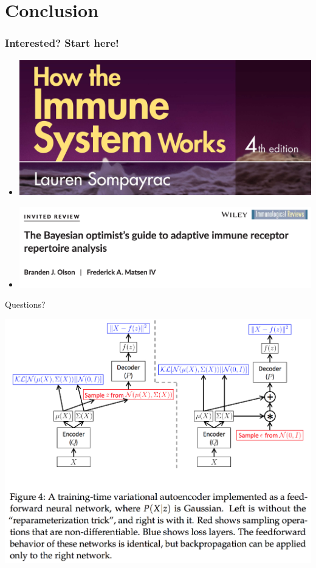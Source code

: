 \documentclass[mathserif,compress]{beamer}
\renewcommand\;{\,}
\begin{document}
\section{Conclusion}

\begin{frame}\frametitle{Interested? Start here!}
\begin{itemize}
\item[]
\begin{center}
\includegraphics[width=0.8 \linewidth]{Images/Sompayrac.png}
\end{center}
\bigskip
\item[]
\begin{center}
\includegraphics[width=\linewidth]{Images/Optimist.png}
\end{center}
\end{itemize}
\end{frame}

\begin{frame}
\begin{center}
\large
Questions?
\end{center}
\end{frame}

\begin{frame}
\begin{center}
\includegraphics[width=\linewidth]{Images/VAE_diagram.png}
\end{center}
\end{frame}
\end{document}
